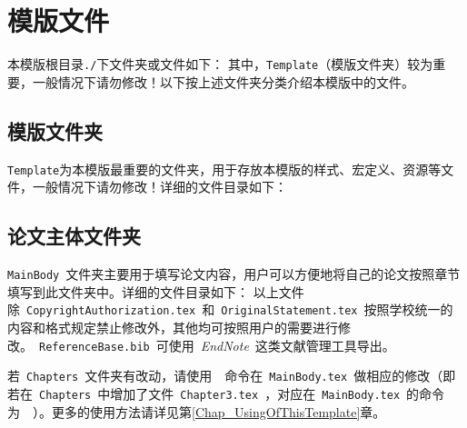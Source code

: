 \section{模版文件}
\label{Sect_Files}
本模版根目录\verb|./|下文件夹或文件如下：
其中，\verb|Template|（模版文件夹）较为重要，一般情况下请勿修改！以下按上述文件夹分类介绍本模版中的文件。

\subsection{模版文件夹}
\label{Subsect_TemplateFolder}
\verb|Template|为本模版最重要的文件夹，用于存放本模版的样式、宏定义、资源等文件，一般情况下请勿修改！详细的文件目录如下：

\subsection{论文主体文件夹}
\label{Subsect_MainbodyFolder}
\verb|MainBody|~文件夹主要用于填写论文内容，用户可以方便地将自己的论文按照章节填写到此文件夹中。详细的文件目录如下：
以上文件除~\verb|CopyrightAuthorization.tex|~和~\verb|OriginalStatement.tex|~按照学校统一的内容和格式规定禁止修改外，其他均可按照用户的需要进行修改。~\verb|ReferenceBase.bib|~可使用~\emph{EndNote\textsuperscript{\texttrademark}}~这类文献管理工具导出。


若~\verb|Chapters|~文件夹有改动，请使用~\verb||~命令在~\verb|MainBody.tex|~做相应的修改（即若在~\verb|Chapters|~中增加了文件~\verb|Chapter3.tex|~，对应在~\verb|MainBody.tex|~的命令为~\verb||~）。更多的使用方法请详见第\ref{Chap_UsingOfThisTemplate}章。

